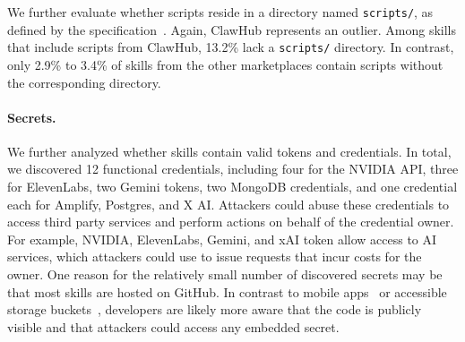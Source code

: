 We further evaluate whether scripts reside in a directory named \texttt{scripts/}, as defined by the specification~\cite{skill_specification_mintlify}. Again, ClawHub represents an outlier. Among skills that include scripts from ClawHub, 13.2\% lack a \texttt{scripts/} directory. In contrast, only 2.9\% to 3.4\% of skills from the other marketplaces contain scripts without the corresponding directory.


\paragraph{Secrets.}
We further analyzed whether skills contain valid tokens and credentials. In total, we discovered 12 functional credentials, including four for the NVIDIA API, three for ElevenLabs, two Gemini tokens, two MongoDB credentials, and one credential each for Amplify, Postgres, and X AI.
Attackers could abuse these credentials to access third party services and perform actions on behalf of the credential owner. For example, NVIDIA, ElevenLabs, Gemini, and xAI token allow access to AI services, which attackers could use to issue requests that incur costs for the owner. One reason for the relatively small number of discovered secrets may be that most skills are hosted on GitHub. In contrast to mobile apps~\cite{schmidt:2025:app_secrets} or accessible storage buckets~\cite{yadmani:2025:s3_secrets}, developers are likely more aware that the code is publicly visible and that attackers could access any embedded secret.


